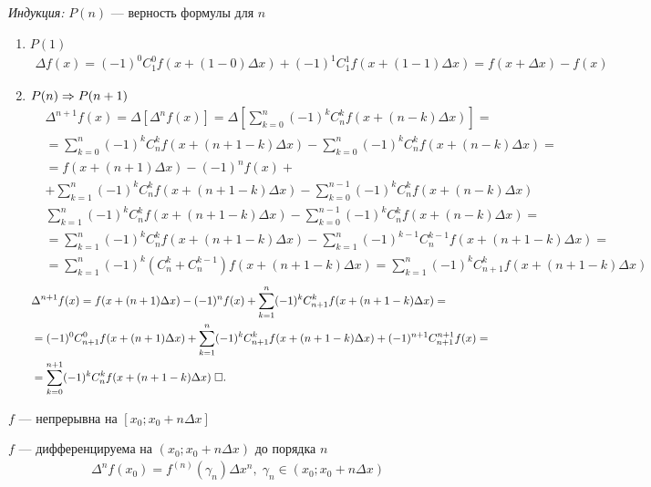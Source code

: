 \documentclass{article}
\begin{document}
{\it Индукция:} $P(n)$ --- верность формулы для $n$
\begin{enumerate}
	\item{}$P(1)$
	\begin{align*}
		\Delta f(x)=(-1)^{0}C_{1}^{0}f(x+(1-0)\Delta x)+(-1)^{1}C_{1}^{1}f(x+(1-1)\Delta x)=f(x+\Delta x)-f(x)
	\end{align*}
	\item{}$P(n)\Rarr P(n+1)$
	\begin{align*}
		 & \Delta^{n+1}f(x)=\Delta[\Delta^{n}f(x)]=\Delta\left[\sum_{k=0}^{n}(-1)^{k}C_{n}^{k}f(x+(n-k)\Delta x)\right]= \\
		 & =\sum_{k=0}^{n}(-1)^{k}C_{n}^{k}f(x+(n+1-k)\Delta x)-\sum_{k=0}^{n}(-1)^{k}C_{n}^{k}f(x+(n-k)\Delta x)=       \\
		 & =f(x+(n+1)\Delta x)-(-1)^{n}f(x)+                                                                             \\
		 & +\sum_{k=1}^{n}(-1)^{k}C_{n}^{k}f(x+(n+1-k)\Delta x)-\sum_{k=0}^{n-1}(-1)^{k}C_{n}^{k}f(x+(n-k)\Delta x)
	\end{align*}
	\begin{align*}
		 & \sum_{k=1}^{n}(-1)^{k}C_{n}^{k}f(x+(n+1-k)\Delta x)-\sum_{k=0}^{n-1}(-1)^{k}C_{n}^{k}f(x+(n-k)\Delta x)=                 \\
		 & =\sum_{k=1}^{n}(-1)^{k}C_{n}^{k}f(x+(n+1-k)\Delta x)-\sum_{k=1}^{n}(-1)^{k-1}C_{n}^{k-1}f(x+(n+1-k)\Delta x)=            \\
		 & =\sum_{k=1}^{n}(-1)^{k}(C_{n}^{k}+C_{n}^{k-1})f(x+(n+1-k)\Delta x)=\sum_{k=1}^{n}(-1)^{k}C_{n+1}^{k}f(x+(n+1-k)\Delta x)
	\end{align*}
	\begin{align*}
		 & \Delta^{n+1}f(x) =f(x+(n+1)\Delta x)-(-1)^{n}f(x)+\sum_{k=1}^{n}(-1)^{k}C_{n+1}^{k}f(x+(n+1-k)\Delta x)=                  \\
		 & =(-1)^{0}C_{n+1}^{0}f(x+(n+1)\Delta x)+\sum_{k=1}^{n}(-1)^{k}C_{n+1}^{k}f(x+(n+1-k)\Delta x)+(-1)^{n+1}C_{n+1}^{n+1}f(x)= \\
		 & =\sum_{k=0}^{n+1}(-1)^{k}C_{n}^{k}f(x+(n+1-k)\Delta x)\qed
	\end{align*}
\end{enumerate}

\theorem

$f$ --- непрерывна на $[x_0;x_0+n\Delta x]$

$f$ --- дифференцируема на $(x_0;x_0+n\Delta x)$ до порядка $n$
\begin{align*}
	\Delta^{n}f(x_0)=f^{(n)}(\gamma_{n})\Delta x^{n},\;\gamma_{n}\in(x_0;x_0+n\Delta x)
\end{align*}
\end{document}
